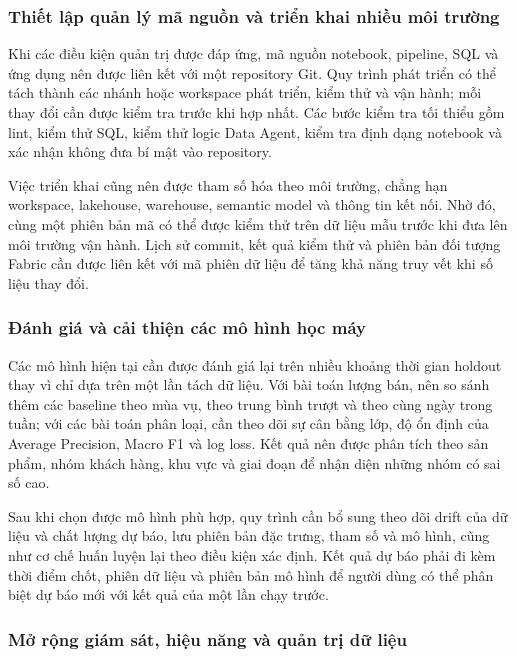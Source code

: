 \subsubsection{Thiết lập quản lý mã nguồn và triển khai nhiều môi trường}

Khi các điều kiện quản trị được đáp ứng, mã nguồn notebook, pipeline, SQL và ứng dụng nên được liên kết với một repository Git. Quy trình phát triển có thể tách thành các nhánh hoặc workspace phát triển, kiểm thử và vận hành; mỗi thay đổi cần được kiểm tra trước khi hợp nhất. Các bước kiểm tra tối thiểu gồm lint, kiểm thử SQL, kiểm thử logic Data Agent, kiểm tra định dạng notebook và xác nhận không đưa bí mật vào repository.

Việc triển khai cũng nên được tham số hóa theo môi trường, chẳng hạn workspace, lakehouse, warehouse, semantic model và thông tin kết nối. Nhờ đó, cùng một phiên bản mã có thể được kiểm thử trên dữ liệu mẫu trước khi đưa lên môi trường vận hành. Lịch sử commit, kết quả kiểm thử và phiên bản đối tượng Fabric cần được liên kết với mã phiên dữ liệu để tăng khả năng truy vết khi số liệu thay đổi.

\subsubsection{Đánh giá và cải thiện các mô hình học máy}

Các mô hình hiện tại cần được đánh giá lại trên nhiều khoảng thời gian holdout thay vì chỉ dựa trên một lần tách dữ liệu. Với bài toán lượng bán, nên so sánh thêm các baseline theo mùa vụ, theo trung bình trượt và theo cùng ngày trong tuần; với các bài toán phân loại, cần theo dõi sự cân bằng lớp, độ ổn định của Average Precision, Macro F1 và log loss. Kết quả nên được phân tích theo sản phẩm, nhóm khách hàng, khu vực và giai đoạn để nhận diện những nhóm có sai số cao.

Sau khi chọn được mô hình phù hợp, quy trình cần bổ sung theo dõi drift của dữ liệu và chất lượng dự báo, lưu phiên bản đặc trưng, tham số và mô hình, cũng như cơ chế huấn luyện lại theo điều kiện xác định. Kết quả dự báo phải đi kèm thời điểm chốt, phiên dữ liệu và phiên bản mô hình để người dùng có thể phân biệt dự báo mới với kết quả của một lần chạy trước.

\subsubsection{Mở rộng giám sát, hiệu năng và quản trị dữ liệu}

